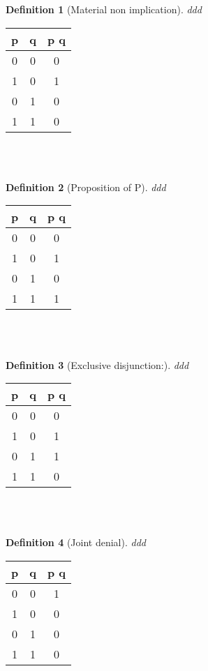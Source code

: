 \documentclass[10pt,a4paper,draft,titlepage,onecolumn]{book}
\newtheorem{definition}{Definition}[section]
\begin{document}
\begin{definition}[Material non implication]ddd
\end{definition}
\begin{tabular}{ |c|c|c| }
 \hline
 p & q &  p  q  \\
 \hline
 0 & 0 & 0 \\
 1 & 0 & 1\\
 0 & 1 & 0\\
 1 & 1 & 0\\
 \hline
\end{tabular}\\\\


\begin{definition}[Proposition of P]ddd
\end{definition}
\begin{tabular}{ |c|c|c| }
 \hline
 p & q &  p  q  \\
 \hline
 0 & 0 & 0 \\
 1 & 0 & 1\\
 0 & 1 & 0\\
 1 & 1 & 1\\
 \hline
\end{tabular}\\\\


\begin{definition}[Exclusive disjunction:]ddd
\end{definition}
\begin{tabular}{ |c|c|c| }
 \hline
 p & q &  p  q  \\
 \hline
 0 & 0 & 0 \\
 1 & 0 & 1\\
 0 & 1 & 1\\
 1 & 1 & 0\\
 \hline
\end{tabular}\\\\




\begin{definition}[Joint denial]ddd
\end{definition}
\begin{tabular}{ |c|c|c| }
 \hline
 p & q &  p  q  \\
 \hline
 0 & 0 & 1 \\
 1 & 0 & 0\\
 0 & 1 & 0\\
 1 & 1 & 0\\
 \hline
\end{tabular}\\\\
\end{document}
